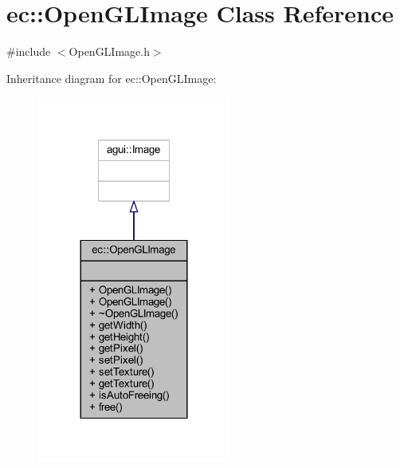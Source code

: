 \hypertarget{classec_1_1_open_g_l_image}{}\section{ec\+:\+:Open\+G\+L\+Image Class Reference}
\label{classec_1_1_open_g_l_image}


{\ttfamily \#include $<$Open\+G\+L\+Image.\+h$>$}



Inheritance diagram for ec\+:\+:Open\+G\+L\+Image\+:\nopagebreak
\begin{figure}[H]
\begin{center}
\leavevmode
\includegraphics[width=180pt]{classec_1_1_open_g_l_image__inherit__graph}
\end{center}
\end{figure}


